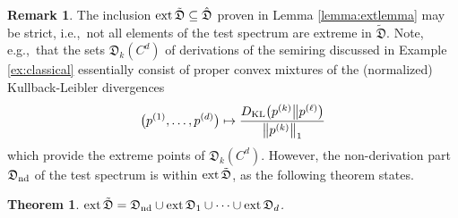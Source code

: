 \documentclass[12pt,a4paper,reqno]{amsart}
\newtheorem{theorem}[proposition]{Theorem}
\theoremstyle{definition}
\newtheorem{remark}[proposition]{Remark}
\newcommand{\mf}[1]{\mathfrak{#1}}
\let\originalleft\left
\let\originalright\right
\renewcommand{\left}{\mathopen{}\mathclose\bgroup\originalleft}
\renewcommand{\right}{\aftergroup\egroup\originalright}
\begin{document}
\begin{remark}
The inclusion ${\rm ext}\,\tilde{\mf D}\subseteq\hat{\mf D}$ proven in Lemma \ref{lemma:extlemma} may be strict, i.e.,\ not all elements of the test spectrum are extreme in $\tilde{\mf D}$. Note, e.g.,\ that the sets $\mf D_k(C^d)$ of derivations of the semiring discussed in Example \ref{ex:classical} essentially consist of proper convex mixtures of the (normalized) Kullback-Leibler divergences
$$
\big(p^{(1)},\ldots,p^{(d)}\big)\mapsto\frac{D_{\rm KL}\big(p^{(k)}\big\|p^{(\ell)}\big)}{\left\|p^{(k)}\right\|_1}
$$
which provide the extreme points of $\mf D_k(C^d)$. However, the non-derivation part $\mf D_{\rm nd}$ of the test spectrum is within ${\rm ext}\,\tilde{\mf D}$, as the following theorem states.
\end{remark}

\begin{theorem}\label{theor:extreme}
${\rm ext}\,\tilde{\mf D}=\mf D_{\rm nd}\cup{\rm ext}\,\mf D_1\cup\cdots\cup{\rm ext}\,\mf D_d$.
\end{theorem}
\end{document}
